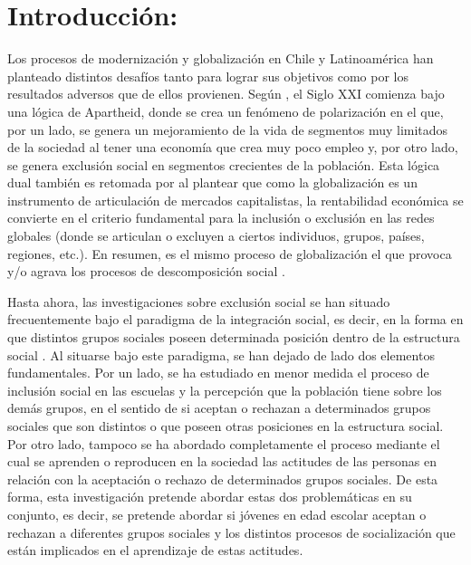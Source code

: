 \documentclass[12pt,twoside]{templates/facsothesis}
\begin{document}
\hypertarget{introducciuxf3n}{%
\chapter{Introducción:}\label{introducciuxf3n}}

Los procesos de modernización y globalización en Chile y Latinoamérica han planteado distintos desafíos tanto para lograr sus objetivos como por los resultados adversos que de ellos provienen. Según \citet{sunkel_sostenibilidad_1998}, el Siglo XXI comienza bajo una lógica de Apartheid, donde se crea un fenómeno de polarización en el que, por un lado, se genera un mejoramiento de la vida de segmentos muy limitados de la sociedad al tener una economía que crea muy poco empleo y, por otro lado, se genera exclusión social en segmentos crecientes de la población. Esta lógica dual también es retomada por \citet{castells_globalizacion_2005} al plantear que como la globalización es un instrumento de articulación de mercados capitalistas, la rentabilidad económica se convierte en el criterio fundamental para la inclusión o exclusión en las redes globales (donde se articulan o excluyen a ciertos individuos, grupos, países, regiones, etc.). En resumen, es el mismo proceso de globalización el que provoca y/o agrava los procesos de descomposición social \citep{lechner_debate_1992}.

Hasta ahora, las investigaciones sobre exclusión social se han situado frecuentemente bajo el paradigma de la integración social, es decir, en la forma en que distintos grupos sociales poseen determinada posición dentro de la estructura social \citep[ej.][]{young_justicia_2000, wade_raza_2000, viverosvigoya_interseccionalidad_2016}. Al situarse bajo este paradigma, se han dejado de lado dos elementos fundamentales. Por un lado, se ha estudiado en menor medida el proceso de inclusión social en las escuelas \citep{blanco_equidad_2006} y la percepción que la población tiene sobre los demás grupos, en el sentido de si aceptan o rechazan a determinados grupos sociales que son distintos o que poseen otras posiciones en la estructura social. Por otro lado, tampoco se ha abordado completamente el proceso mediante el cual se aprenden o reproducen en la sociedad las actitudes de las personas en relación con la aceptación o rechazo de determinados grupos sociales. De esta forma, esta investigación pretende abordar estas dos problemáticas en su conjunto, es decir, se pretende abordar si jóvenes en edad escolar aceptan o rechazan a diferentes grupos sociales y los distintos procesos de socialización que están implicados en el aprendizaje de estas actitudes.
\end{document}
